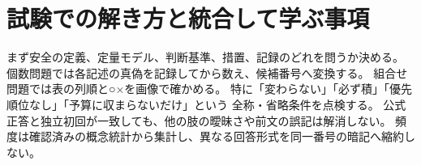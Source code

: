 \section{試験での解き方と統合して学ぶ事項}
まず安全の定義、定量モデル、判断基準、措置、記録のどれを問うか決める。
個数問題では各記述の真偽を記録してから数え、候補番号へ変換する。
組合せ問題では表の列順と○×を画像で確かめる。
特に「変わらない」「必ず積」「優先順位なし」「予算に収まらないだけ」という
全称・省略条件を点検する。
公式正答と独立初回が一致しても、他の肢の曖昧さや前文の誤記は解消しない。
頻度は確認済みの概念統計から集計し、異なる回答形式を同一番号の暗記へ縮約しない。





